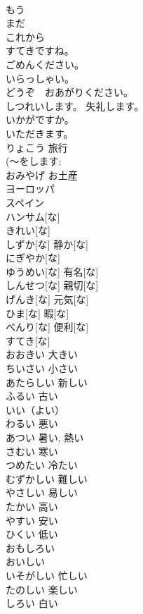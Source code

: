 \documentclass[8pt]{extreport}
\begin{document}
\begin{CJK}{UTF8}{min}
\\	もう			
\\	まだ			
\\	これから			
\\	[～、]すてきですね。			
\\	ごめんください。			
\\	いらっしゃい。			
\\	どうぞ　おあがりください。			
\\	しつれいします。	失礼します。	
\\	[～は]いかがですか。			
\\	いただきます。			
\\	りょこう	旅行	
\\	(～をします: 
\\	おみやげ	お土産	
\\	ヨーロッパ			
\\	スペイン			
\\	ハンサム[な]			
\\	きれい[な]			
\\	しずか[な]	静か[な]	
\\	にぎやか[な]			
\\	ゆうめい[な]	有名[な]	
\\	しんせつ[な]	親切[な]	
\\	げんき[な]	元気[な]	
\\	ひま[な]	暇[な]	
\\	べんり[な]	便利[な]	
\\	すてき[な]			
\\	おおきい	大きい	
\\	ちいさい	小さい	
\\	あたらしい	新しい	
\\	ふるい	古い	
\\	いい（よい）			
\\	わるい	悪い	
\\	あつい	暑い, 熱い	
\\	さむい	寒い	
\\	つめたい	冷たい	
\\	むずかしい	難しい	
\\	やさしい	易しい	
\\	たかい	高い	
\\	やすい	安い	
\\	ひくい	低い	
\\	おもしろい			
\\	おいしい			
\\	いそがしい	忙しい	
\\	たのしい	楽しい	
\\	しろい	白い	

\end{CJK}
\end{document}

